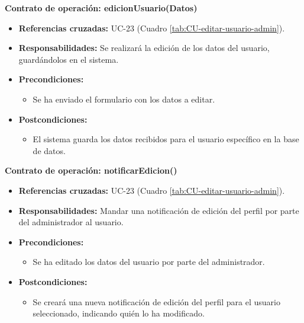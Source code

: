 \textbf{Contrato de operación: edicionUsuario(Datos)}
\begin{itemize}
\item \textbf{Referencias cruzadas:} UC-23 (Cuadro \ref{tab:CU-editar-usuario-admin}).
\item \textbf{Responsabilidades:} Se realizará la edición de los datos del usuario, guardándolos en el sistema.
\item \textbf{Precondiciones:} 
 \begin{itemize}
\item Se ha enviado el formulario con los datos a editar.
\end {itemize}
\item \textbf{Postcondiciones:} 
 \begin{itemize}
\item El sistema guarda los datos recibidos para el usuario específico en la base de datos.
\end {itemize}
\end {itemize}

\textbf{Contrato de operación: notificarEdicion()}
\begin{itemize}
\item \textbf{Referencias cruzadas:} UC-23 (Cuadro \ref{tab:CU-editar-usuario-admin}).
\item \textbf{Responsabilidades:} Mandar una notificación de edición del perfil por parte del administrador al usuario.
\item \textbf{Precondiciones:} 
 \begin{itemize}
\item Se ha editado los datos del usuario por parte del administrador.
\end {itemize}
\item \textbf{Postcondiciones:} 
 \begin{itemize}
\item Se creará una nueva notificación de edición del perfil para el usuario seleccionado, indicando quién lo ha modificado.
\end {itemize}
\end {itemize}

